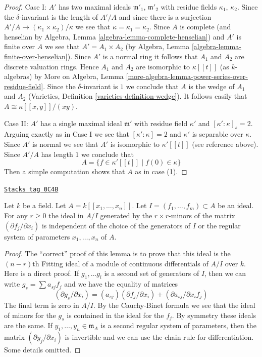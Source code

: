 \begin{proof}
\medskip\noindent
Case I: $A'$ has two maximal ideals $\mathfrak m'_1$, $\mathfrak m'_2$
with residue fields $\kappa_1$, $\kappa_2$.
Since the $\delta$-invariant is the length of $A'/A$ and
since there is a surjection $A'/A \to (\kappa_1 \times \kappa_2)/\kappa$
we see that $\kappa = \kappa_1 = \kappa_2$. Since $A$ is complete
(and henselian by Algebra, Lemma \ref{algebra-lemma-complete-henselian})
and $A'$ is finite over $A$ we see that $A' = A_1 \times A_2$
(by Algebra, Lemma \ref{algebra-lemma-finite-over-henselian}).
Since $A'$ is a normal ring it follows that $A_1$ and $A_2$ are
discrete valuation rings.
Hence $A_1$ and $A_2$ are isomorphic to $\kappa[[t]]$
(as $k$-algebras) by
More on Algebra, Lemma \ref{more-algebra-lemma-power-series-over-residue-field}.
Since the $\delta$-invariant is $1$ we conclude that $A$
is the wedge of $A_1$ and $A_2$
(Varieties, Definition \ref{varieties-definition-wedge}).
It follows easily that $A \cong \kappa[[x, y]]/(xy)$.

\medskip\noindent
Case II: $A'$ has a single maximal ideal $\mathfrak m'$ with residue
field $\kappa'$ and $[\kappa' : \kappa]_s = 2$. Arguing exactly
as in Case I we see that $[\kappa' : \kappa] = 2$ and $\kappa'$
is separable over $\kappa$. Since $A'$ is normal we see that
$A'$ is isomorphic to $\kappa'[[t]]$ (see reference above).
Since $A'/A$ has length $1$ we conclude that
$$
A = \{f \in \kappa'[[t]] \mid f(0) \in \kappa\}
$$
Then a simple computation shows that $A$ as in case (1).
\end{proof}

\begin{lemma}
\label{curves-lemma-fitting-ideal-well-defined}
\href{https://stacks.math.columbia.edu/tag/0C4B}{\texttt{Stacks tag 0C4B}}

Let $k$ be a field. Let $A = k[[x_1, \ldots, x_n]]$. Let
$I = (f_1, \ldots, f_m) \subset A$ be an ideal. For any
$r \geq 0$ the ideal in $A/I$ generated by the $r \times r$-minors
of the matrix $(\partial f_j/\partial x_i)$ is independent
of the choice of the generators of $I$ or the
regular system of parameters $x_1, \ldots, x_n$ of $A$.
\end{lemma}

\begin{proof}
The ``correct'' proof of this lemma is to prove that this ideal
is the $(n - r)$th Fitting ideal of a module of continuous differentials
of $A/I$ over $k$. Here is a direct proof.
If $g_1, \ldots g_l$ is a second set of generators of $I$, then
we can write $g_s = \sum a_{sj}f_j$ and we have the equality of matrices
$$
(\partial g_s/\partial x_i) = (a_{sj}) (\partial f_j/\partial x_i)
+ (\partial a_{sj}/\partial x_i f_j)
$$
The final term is zero in $A/I$.
By the Cauchy-Binet formula we see that the ideal of minors for the
$g_s$ is contained in the ideal for the $f_j$. By symmetry
these ideals are the same. If $y_1, \ldots, y_n \in \mathfrak m_A$
is a second regular system of parameters, then the matrix
$(\partial y_j/\partial x_i)$
is invertible and we can use the chain rule for differentiation.
Some details omitted.
\end{proof}

